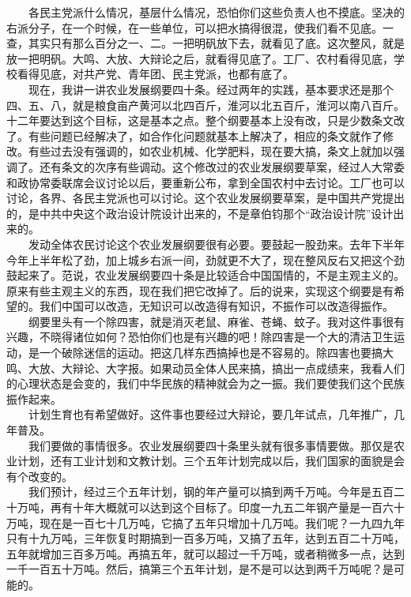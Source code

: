 \documentclass[cn,11pt,chinese]{elegantbook}
\begin{document}
　　各民主党派什么情况，基层什么情况，恐怕你们这些负责人也不摸底。坚决的右派分子，在一个时候，在一些单位，可以把水搞得很混，使我们看不见底。一查，其实只有那么百分之一、二。一把明矾放下去，就看见了底。这次整风，就是放一把明矾。大鸣、大放、大辩论之后，就看得见底了。工厂、农村看得见底，学校看得见底，对共产党、青年团、民主党派，也都有底了。\\
　　现在，我讲一讲农业发展纲要四十条。经过两年的实践，基本要求还是那个四、五、八，就是粮食亩产黄河以北四百斤，淮河以北五百斤，淮河以南八百斤。十二年要达到这个目标，这是基本之点。整个纲要基本上没有改，只是少数条文改了。有些问题已经解决了，如合作化问题就基本上解决了，相应的条文就作了修改。有些过去没有强调的，如农业机械、化学肥料，现在要大搞，条文上就加以强调了。还有条文的次序有些调动。这个修改过的农业发展纲要草案，经过人大常委和政协常委联席会议讨论以后，要重新公布，拿到全国农村中去讨论。工厂也可以讨论，各界、各民主党派也可以讨论。这个农业发展纲要草案，是中国共产党提出的，是中共中央这个政治设计院设计出来的，不是章伯钧那个“政治设计院”设计出来的。\\
　　发动全体农民讨论这个农业发展纲要很有必要。要鼓起一股劲来。去年下半年今年上半年松了劲，加上城乡右派一间，劲就更不大了，现在整风反右又把这个劲鼓起来了。范说，农业发展纲要四十条是比较适合中国国情的，不是主观主义的。原来有些主观主义的东西，现在我们把它改掉了。后的说来，实现这个纲要是有希望的。我们中国可以改造，无知识可以改造得有知识，不振作可以改造得振作。\\
　　纲要里头有一个除四害，就是消灭老鼠、麻雀、苍蝇、蚊子。我对这件事很有兴趣，不晓得诸位如何？恐怕你们也是有兴趣的吧！除四害是一个大的清洁卫生运动，是一个破除迷信的运动。把这几样东西搞掉也是不容易的。除四害也要搞大鸣、大放、大辩论、大字报。如果动员全体人民来搞，搞出一点成绩来，我看人们的心理状态是会变的，我们中华民族的精神就会为之一振。我们要使我们这个民族振作起来。\\
　　计划生育也有希望做好。这件事也要经过大辩论，要几年试点，几年推广，几年普及。\\
　　我们要做的事情很多。农业发展纲要四十条里头就有很多事情要做。那仅是农业计划，还有工业计划和文教计划。三个五年计划完成以后，我们国家的面貌是会有个改变的。\\
　　我们预计，经过三个五年计划，钢的年产量可以搞到两千万吨。今年是五百二十万吨，再有十年大概就可以达到这个目标了。印度一九五二年钢产量是一百六十万吨，现在是一百七十几万吨，它搞了五年只增加十几万吨。我们呢？一九四九年只有十九万吨，三年恢复时期搞到一百多万吨，又搞了五年，达到五百二十万吨，五年就增加三百多万吨。再搞五年，就可以超过一千万吨，或者稍微多一点，达到一千一百五十万吨。然后，搞第三个五年计划，是不是可以达到两千万吨呢？是可能的。\\
\end{document}
